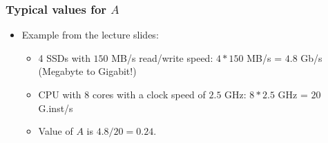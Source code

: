 \begin{frame}
\frametitle{Typical values for $A$}

\begin{itemize}
	\item<1-> Example from the lecture slides:
	\begin{itemize}
		\item<1-> 4 SSDs with $150$ MB/s read/write speed: $4 * 150$ MB/s = $4.8$ Gb/s (Megabyte to Gigabit!)
		\item<1-> CPU with 8 cores with a clock speed of $2.5$ GHz: $8 * 2.5$ GHz = $20$ G.inst/s
		\item<1-> Value of $A$ is $4.8 / 20 = 0.24$.
	\end{itemize}
\end{itemize}

\end{frame}


